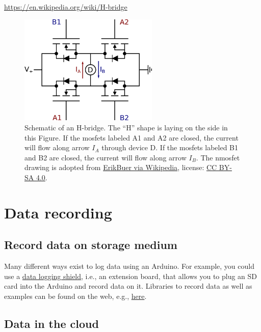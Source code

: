 \url{https://en.wikipedia.org/wiki/H-bridge}

\begin{figure}[tb]
    \centering
    \includegraphics[width=250px]{graphics/06_further/h-bridge.png}
    \caption{Schematic of an H-bridge. The ``H'' shape is laying on the side in this Figure. If the \acp{mosfet} labeled A1 and A2 are closed, the current will flow along arrow $I_A$ through device D. If the \acp{mosfet} labeled B1 and B2 are closed, the current will flow along arrow $I_B$. The n\ac{mosfet} drawing is adopted from \href{https://en.wikipedia.org/wiki/Electronic_symbol\#/media/File:Enh_N_channel_Mosfet.svg}{ErikBuer via Wikipedia}, license: \href{https://creativecommons.org/licenses/by-sa/4.0/}{CC BY-SA 4.0}.}
    \label{fig:figure1}
\end{figure}


\section{Data recording}

\subsection{Record data on storage medium}

Many different ways exist to log data using an Arduino. For example, you could use a \href{https://www.arrow.com/en/products/1141/adafruit-industries}{data logging shield}, i.e., an extension board, that allows you to plug an SD card into the Arduino and record data on it. Libraries to record data as well as examples can be found on the web, e.g., \href{https://www.arrow.com/en/research-and-events/articles/data-logging-with-arduino-tutorial}{here}.

\subsection{Data in the cloud}

